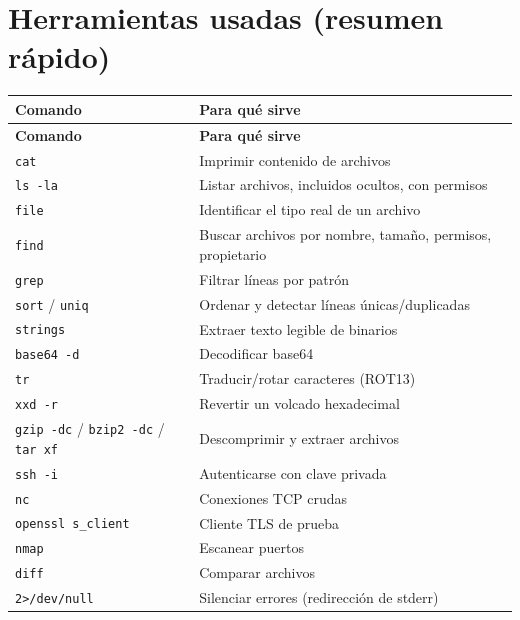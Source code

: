 \documentclass[11pt,a4paper]{article}
\begin{document}
\section*{Herramientas usadas (resumen rápido)}
\begin{longtable}{@{}lp{9.5cm}@{}}
\toprule \textbf{Comando} & \textbf{Para qué sirve} \\
\midrule
\endfirsthead
\toprule \textbf{Comando} & \textbf{Para qué sirve} \\
\midrule
\endhead
\bottomrule
\endlastfoot
\texttt{cat} & Imprimir contenido de archivos \\
\texttt{ls -la} & Listar archivos, incluidos ocultos, con permisos \\
\texttt{file} & Identificar el tipo real de un archivo \\
\texttt{find} & Buscar archivos por nombre, tamaño, permisos, propietario \\
\texttt{grep} & Filtrar líneas por patrón \\
\texttt{sort} / \texttt{uniq} & Ordenar y detectar líneas únicas/duplicadas \\
\texttt{strings} & Extraer texto legible de binarios \\
\texttt{base64 -d} & Decodificar base64 \\
\texttt{tr} & Traducir/rotar caracteres (ROT13) \\
\texttt{xxd -r} & Revertir un volcado hexadecimal \\
\texttt{gzip -dc} / \texttt{bzip2 -dc} / \texttt{tar xf} & Descomprimir y extraer archivos \\
\texttt{ssh -i} & Autenticarse con clave privada \\
\texttt{nc} & Conexiones TCP crudas \\
\texttt{openssl s\_client} & Cliente TLS de prueba \\
\texttt{nmap} & Escanear puertos \\
\texttt{diff} & Comparar archivos \\
\texttt{2>/dev/null} & Silenciar errores (redirección de stderr) \\
\end{longtable}
\end{document}
